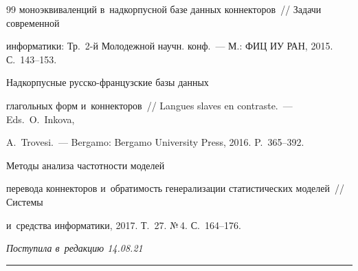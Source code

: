 {{\begin{thebibliography}{99}
моноэквиваленций в~надкорпусной базе данных коннекторов~/\!\!/ Задачи современной 


информатики: Тр.\ 2-й Молодежной научн. конф.~--- М.: ФИЦ ИУ РАН, 2015. С.~143--153.




 Надкорпусные рус\-ско-фран\-цуз\-ские базы данных 


глагольных форм и~коннекторов~/\!\!/ Langues slaves en contraste.~--- Eds.\ O.~Inkova, 


A.~Trovesi.~--- Bergamo: Bergamo University Press, 2016. P.~365--392.




 Методы анализа час\-тот\-ности моделей 


перевода коннекторов и~об\-ра\-ти\-мость генерализации статистических моделей~/\!\!/ Системы 


и~средства информатики, 2017. Т.~27. №\,4. С.~164--176.


  \end{thebibliography}


} }











\vspace*{-4pt}





\hfill{\small\textit{Поступила в~редакцию 14.08.21}}





\vspace*{6pt}





\hrule





\vspace*{2pt}















